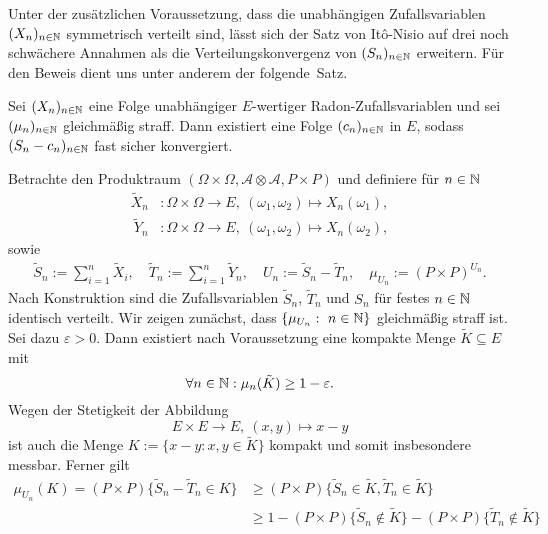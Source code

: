 Unter der zusätzlichen Voraussetzung, dass die unabhängigen Zufallsvariablen $(X_n)_{n \in \mathbb{N}}$ symmetrisch verteilt sind, lässt sich der Satz von Itô-Nisio auf drei noch schwächere Annahmen als die Verteilungskonvergenz von $(S_n)_{n \in \mathbb{N}}$ erweitern. 
Für den Beweis dient uns unter anderem der \mbox{folgende Satz.} 
\begin{theorem}
    Sei $(X_n)_{n \in \mathbb{N}}$ eine Folge unabhängiger $E$-wertiger Radon-Zufallsvariablen und sei $(\mu_n)_{n \in \mathbb{N}}$ gleichmäßig straff. Dann existiert eine Folge $(c_n)_{n \in \mathbb{N}}$ in $E$, sodass $(S_n - c_n)_{n \in \mathbb{N}}$ fast sicher konvergiert.
\end{theorem}

\begin{proof*}
    Betrachte den Produktraum $(\Omega \times \Omega, \mathcal{A} \otimes \mathcal{A}, P \times P)$ und definiere für $n \in \mathbb{N}$
    \begin{align*}
        \widetilde{X}_n&: \Omega \times \Omega \to E, \ (\omega_1, \omega_2) \mapsto X_n(\omega_1), \\\
        \widetilde{Y}_n&: \Omega \times \Omega \to E, \ (\omega_1, \omega_2) \mapsto X_n(\omega_2),
    \end{align*}
    sowie 
    \begin{align*}
        \widetilde{S}_n := \sum_{i = 1}^n \widetilde{X}_i, \quad \widetilde{T}_n := \sum_{i = 1}^n \widetilde{Y}_n, \quad U_n := \widetilde{S}_n - \widetilde{T}_n, \quad \mu_{U_n} := (P\times P)^{U_n}. 
    \end{align*}
    Nach Konstruktion sind die Zufallsvariablen $\widetilde{S}_n$, $\widetilde{T}_n$ und $S_n$ für festes $n \in \mathbb{N}$ identisch verteilt. 
    Wir zeigen zunächst, dass $\{\mu_{U_n}: \ n \in \mathbb{N}\}$ gleichmäßig straff ist. 
    Sei dazu $\varepsilon > 0$. Dann existiert nach Voraussetzung eine kompakte Menge $\tilde{K} \subseteq E$ mit 
    $$
        \forall n \in \mathbb{N}: \mu_n(\tilde{K}) \geq 1 - \varepsilon. 
    $$
    Wegen der Stetigkeit der Abbildung 
    $$
        E \times E \to E, \ (x,y) \mapsto x - y
    $$
    ist auch die Menge $K := \{ x - y : x,y \in \tilde{K}\}$ kompakt und somit insbesondere messbar. Ferner gilt
    \begin{align*}
        \mu_{U_n}(K) = (P \times P)\{\widetilde{S}_n - \widetilde{T}_n \in K\} &\geq (P \times P)\{\widetilde{S}_n \in \tilde{K}, \widetilde{T}_n \in \tilde{K}\} \\\
                                                              &\geq 1 - (P \times P)\{\widetilde{S}_n \notin \tilde{K}\} - (P \times P)\{\widetilde{T}_n \notin \tilde{K}\} \\\

\end{align*}
\end{proof*}
